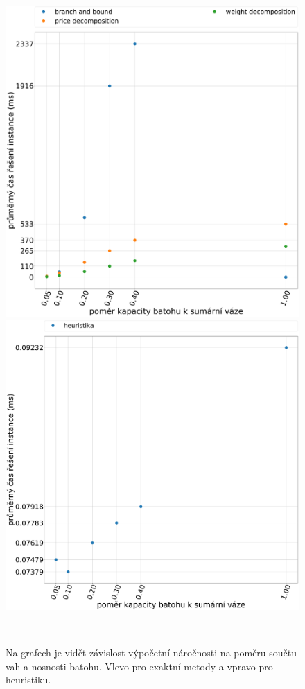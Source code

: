 \documentclass[11pt]{article}
\begin{document}
\begin{figure}
	\centering
    \begin{minipage}[c]{0.49\textwidth}
        \centering\includegraphics[width=\textwidth]{img/mE.pdf} 
    \end{minipage}
    \begin{minipage}[c]{0.49\textwidth}
        \centering \includegraphics[width=\textwidth]{img/mH.pdf} 
    \end{minipage}
    \\
   \caption{Na grafech je vidět závislost výpočetní náročnosti na poměru součtu vah a nosnosti batohu. Vlevo pro exaktní metody a vpravo pro heuristiku.}\label{fig:mI}
    \end{figure} 
    
\end{document}
